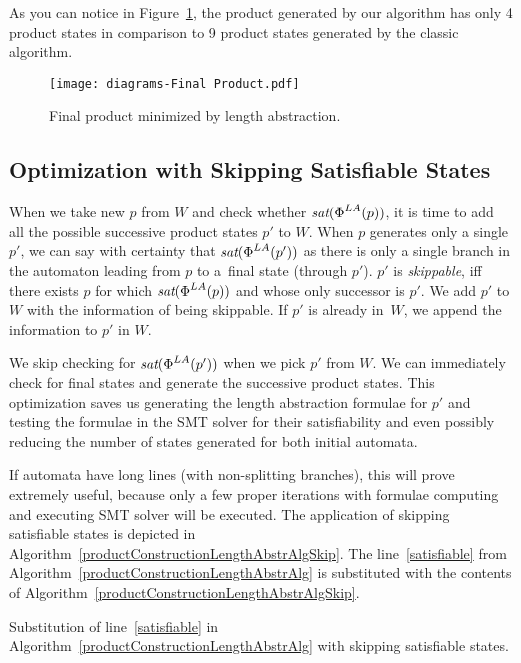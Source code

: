 As you can notice in Figure~\ref{fig:product_final}, the product generated by our algorithm has only 4 product states in comparison to 9 product states generated by the classic algorithm.

\begin{figure}[ht]
	\centering
	\texttt{[image: diagrams-Final Product.pdf]}
	\caption{Final product minimized by length abstraction.}
	\label{fig:product_final}
\end{figure}


\subsection{Optimization with Skipping Satisfiable States} \label{sec:skipping states}

When we take new $p$ from $W$ and check whether $\emph{sat}(\emph{$\Phi$}^{LA}(p))$, it is time to add all the possible successive product states $p'$ to $W$. When $p$ generates only a single $p'$, we can say with certainty that $\emph{sat}(\emph{$\Phi$}^{LA}(p'))$ as there is only a single branch in the automaton leading from $p$ to a~final state (through $p'$). $p'$ is \emph{skippable}, iff there exists $p$ for which $\emph{sat}(\emph{$\Phi$}^{LA}(p))$ and whose only successor is $p'$. We add $p'$ to $W$ with the information of being skippable. If $p'$ is already in~$W$, we append the information to $p'$ in $W$.

We skip checking for $\emph{sat}(\emph{$\Phi$}^{LA}(p'))$ when we pick $p'$ from $W$. We can immediately check for final states and generate the successive product states. This optimization saves us generating the length abstraction formulae for $p'$ and testing the formulae in the SMT solver for their satisfiability and even possibly reducing the number of states generated for both initial automata.

If automata have long lines (with non-splitting branches), this will prove extremely useful, because only a few proper iterations with formulae computing and executing SMT solver will be executed. The application of skipping satisfiable states is depicted in Algorithm~\ref{productConstructionLengthAbstrAlgSkip}. The line~\ref{satisfiable} from Algorithm~\ref{productConstructionLengthAbstrAlg} is substituted with the contents of Algorithm~\ref{productConstructionLengthAbstrAlgSkip}.

\begin{algorithm}[ht]
    \caption{Substitution of line~\ref{satisfiable} in Algorithm~\ref{productConstructionLengthAbstrAlg} with skipping satisfiable states.} \label{productConstructionLengthAbstrAlgSkip}
    \DontPrintSemicolon
\end{algorithm}

